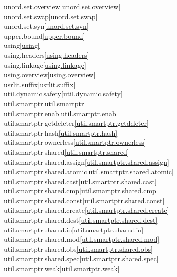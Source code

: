 \begin{multicols}{2}
unord.set.overview\quad\ref{unord.set.overview}\\
unord.set.swap\quad\ref{unord.set.swap}\\
unord.set.syn\quad\ref{unord.set.syn}\\
upper.bound\quad\ref{upper.bound}\\
using\quad\ref{using}\\
using.headers\quad\ref{using.headers}\\
using.linkage\quad\ref{using.linkage}\\
using.overview\quad\ref{using.overview}\\
usrlit.suffix\quad\ref{usrlit.suffix}\\
util.dynamic.safety\quad\ref{util.dynamic.safety}\\
util.smartptr\quad\ref{util.smartptr}\\
util.smartptr.enab\quad\ref{util.smartptr.enab}\\
util.smartptr.getdeleter\quad\ref{util.smartptr.getdeleter}\\
util.smartptr.hash\quad\ref{util.smartptr.hash}\\
util.smartptr.ownerless\quad\ref{util.smartptr.ownerless}\\
util.smartptr.shared\quad\ref{util.smartptr.shared}\\
util.smartptr.shared.assign\quad\ref{util.smartptr.shared.assign}\\
util.smartptr.shared.atomic\quad\ref{util.smartptr.shared.atomic}\\
util.smartptr.shared.cast\quad\ref{util.smartptr.shared.cast}\\
util.smartptr.shared.cmp\quad\ref{util.smartptr.shared.cmp}\\
util.smartptr.shared.const\quad\ref{util.smartptr.shared.const}\\
util.smartptr.shared.create\quad\ref{util.smartptr.shared.create}\\
util.smartptr.shared.dest\quad\ref{util.smartptr.shared.dest}\\
util.smartptr.shared.io\quad\ref{util.smartptr.shared.io}\\
util.smartptr.shared.mod\quad\ref{util.smartptr.shared.mod}\\
util.smartptr.shared.obs\quad\ref{util.smartptr.shared.obs}\\
util.smartptr.shared.spec\quad\ref{util.smartptr.shared.spec}\\
util.smartptr.weak\quad\ref{util.smartptr.weak}\\

\end{multicols}
